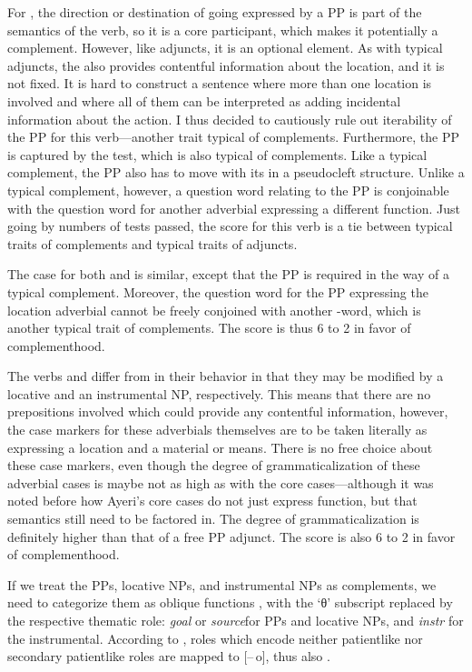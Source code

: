 For , the direction or destination of going expressed by a
PP is part of the semantics of the verb, so it is a core participant, which
makes it potentially a complement. However, like adjuncts, it is an optional
element. As with typical adjuncts, the  also provides contentful
information about the location, and it is not fixed. It is hard to construct a
sentence where more than one location is involved and where all of them can be
interpreted as adding incidental information about the action. I thus decided
to cautiously rule out iterability of the PP for this verb---another trait
typical of complements. Furthermore, the PP is captured by the  test,
which is also typical of complements. Like a typical complement, the PP also
has to move with its  in a pseudocleft structure. Unlike a typical
complement, however, a question word relating to the PP is conjoinable with the
question word for another adverbial expressing a different function. Just going
by numbers of tests passed, the score for this verb is a tie between typical
traits of complements and typical traits of adjuncts.

The case for both  and  is
similar, except that the PP is required in the way of a typical complement.
Moreover, the question word for the PP expressing the location adverbial cannot
be freely conjoined with another -word, which is another typical trait
of complements. The score is thus 6 to 2 in favor of complementhood.

The verbs  and  differ from
 in their behavior in that they may be modified by a
locative and an instrumental NP, respectively. This means that there are no
prepositions involved which could provide any contentful information, however,
the case markers for these adverbials themselves are to be taken literally as
expressing a location and a material or means. There is no free choice about
these case markers, even though the degree of grammaticalization of these
adverbial cases is maybe not as high as with the core cases---although it was
noted before how Ayeri's core cases do not just express function, but that
semantics still need to be factored in. The degree of grammaticalization is
definitely higher than that of a free PP adjunct. The score is also 6 to 2 in
favor of complementhood.

If we treat the PPs, locative NPs, and instrumental NPs as complements, we need
to categorize them as oblique functions \Oblique{}, with the `θ' subscript
replaced by the respective thematic role: \textit{goal} or \textit{source}for
PPs and locative NPs, and \textit{instr} for the instrumental. According to
\textcites[331]{bresnan2016}[414] {needhamtoivonen2011}, roles which encode
neither patientlike nor secondary patientlike roles are mapped to [–\,o], thus
also \Oblique{}.

